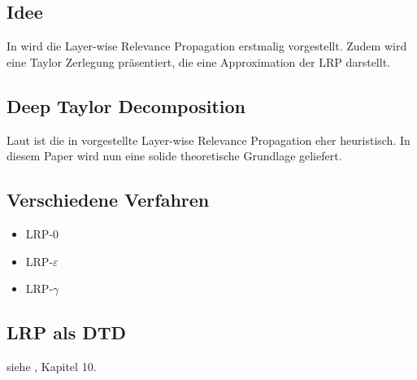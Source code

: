 \documentclass{article}
\theoremstyle{break}
\begin{document}
	\subsection{Idee}
	
	In \cite{LRP_first_paper} wird die Layer-wise Relevance Propagation erstmalig vorgestellt. Zudem wird eine Taylor Zerlegung präsentiert, die eine Approximation der LRP darstellt.
	\subsection{Deep Taylor Decomposition}
	Laut \cite{DTD} ist die in \cite{LRP_first_paper} vorgestellte Layer-wise Relevance Propagation eher heuristisch. In diesem Paper wird nun eine solide theoretische Grundlage geliefert.\\
	
	\begin{comment}
		The widely used Oaxaca decomposition applies to linear models. Extending it to commonly used nonlinear models such as binary choice and duration models is not straightforward. This paper shows that the original decomposition using a linear model can be obtained as a first order Taylor expansion. This basis provides a means of obtaining a coherent and unified approach which applies to nonlinear models, which we refer to as a Taylor decomposition. Explicit formulae are provided for the Taylor decomposition for the main nonlinear models used in applied econometrics including the Probit binary choice and Weibull duration models. The detailed decomposition of the explained component is expressed in terms of what are usually referred to as marginal effects and a remainder. Given Jensen's inequality, the latter will always be present in nonlinear models unless an ad hoc or tautological basis for decomposition is used.
	\end{comment}
	
	\subsection{Verschiedene Verfahren}
	
	\begin{itemize}
		\item LRP-0
		\item LRP-$\varepsilon$
		\item LRP-$\gamma$
	\end{itemize}

	\subsection{LRP als DTD}
	siehe \cite{XAI:book}, Kapitel 10.
	
\end{document}

